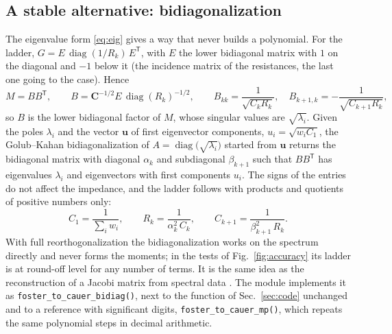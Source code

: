 \documentclass[10pt,a4paper]{scrartcl}
\newcommand{\code}[1]{\texttt{#1}}
\begin{document}
\subsection{A stable alternative: bidiagonalization}
\label{sec:bidiag}
The eigenvalue form \eqref{eq:eig} gives a way that never builds a polynomial. For the ladder, $G = E\,\operatorname{diag}(1/R_k)\,E^\mathsf{T}$, with $E$ the lower bidiagonal matrix with $1$ on the diagonal and $-1$ below it (the incidence matrix of the resistances, the last one going to the case). Hence
\begin{equation}
M = BB^\mathsf{T} , \qquad B = \mathbf{C}^{-1/2} E\, \operatorname{diag}(R_k)^{-1/2} , \qquad B_{kk} = \frac{1}{\sqrt{C_kR_k}} , \quad B_{k+1,k} = -\frac{1}{\sqrt{C_{k+1}R_k}} ,
\end{equation}
so $B$ is the lower bidiagonal factor of $M$, whose singular values are $\sqrt{\lambda_i}$. Given the poles $\lambda_i$ and the vector $\mathbf{u}$ of first eigenvector components, $u_i = \sqrt{w_i C_1}$, the Golub--Kahan bidiagonalization of $A = \operatorname{diag}\bigl(\sqrt{\lambda_i}\bigr)$ started from $\mathbf{u}$ \cite{golubkahan1965,paige1982} returns the bidiagonal matrix with diagonal $\alpha_k$ and subdiagonal $\beta_{k+1}$ such that $BB^\mathsf{T}$ has eigenvalues $\lambda_i$ and eigenvectors with first components $u_i$. The signs of the entries do not affect the impedance, and the ladder follows with products and quotients of positive numbers only:
\begin{equation}
C_1 = \frac{1}{\sum_i w_i} , \qquad R_k = \frac{1}{\alpha_k^2\, C_k} , \qquad C_{k+1} = \frac{1}{\beta_{k+1}^2\, R_k} .
\label{eq:bidiag}
\end{equation}
With full reorthogonalization the bidiagonalization works on the spectrum directly and never forms the moments; in the tests of Fig.~\ref{fig:accuracy} its ladder is at round-off level for any number of terms. It is the same idea as the reconstruction of a Jacobi matrix from spectral data \cite{gragg1984}. The module implements it as \code{foster\_to\_cauer\_bidiag()}, next to the function of Sec.~\ref{sec:code} unchanged and to a reference with \fcmpDigits{} significant digits, \code{foster\_to\_cauer\_mp()}, which repeats the same polynomial steps in decimal arithmetic.
\end{document}
